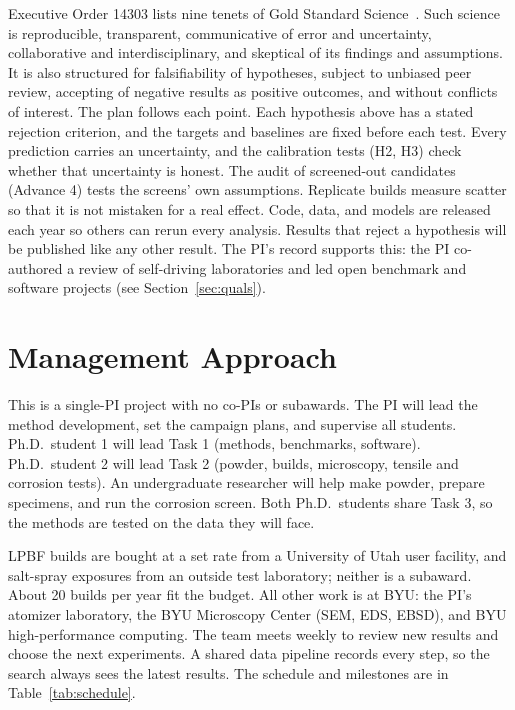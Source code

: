 \documentclass[12pt,letterpaper]{article}
\begin{document}
Executive Order 14303 lists nine tenets of Gold Standard
Science~\cite{eo14303}. Such science is reproducible, transparent,
communicative of error and uncertainty, collaborative and interdisciplinary,
and skeptical of its findings and assumptions. It is also structured for
falsifiability of hypotheses, subject to unbiased peer review, accepting of
negative results as positive outcomes, and without conflicts of interest. The
plan follows each point. Each hypothesis above has a stated rejection
criterion, and the targets and baselines are fixed before each test. Every
prediction carries an uncertainty, and the calibration tests (H2, H3) check
whether that uncertainty is honest. The audit of screened-out candidates
(Advance 4) tests the screens' own assumptions. Replicate builds measure
scatter so that it is not mistaken for a real effect. Code, data, and models
are released each year so others can rerun every analysis. Results that
reject a hypothesis will be published like any other result. The PI's record
supports this: the PI co-authored a review of self-driving laboratories and
led open benchmark and software projects (see Section~\ref{sec:quals}).

\section{Management Approach}
\label{sec:mgmt}

This is a single-PI project with no co-PIs or subawards. The PI will lead the
method development, set the campaign plans, and supervise all students.
Ph.D.\ student 1 will lead Task 1 (methods, benchmarks, software). Ph.D.\
student 2 will lead Task 2 (powder, builds, microscopy, tensile and corrosion
tests). An undergraduate researcher will help make powder, prepare specimens,
and run the corrosion screen. Both Ph.D.\ students share Task 3, so the
methods are tested on the data they will face.

LPBF builds are bought at a set rate from a University of Utah user facility,
and salt-spray exposures from an outside test laboratory; neither is a
subaward. About 20 builds per year fit the budget. All other work is at BYU:
the PI's atomizer laboratory, the BYU Microscopy Center (SEM, EDS, EBSD), and
BYU high-performance computing. The team meets weekly to review new results
and choose the next experiments. A shared data pipeline records every step,
so the search always sees the latest results. The schedule and milestones are
in Table~\ref{tab:schedule}.
\end{document}
